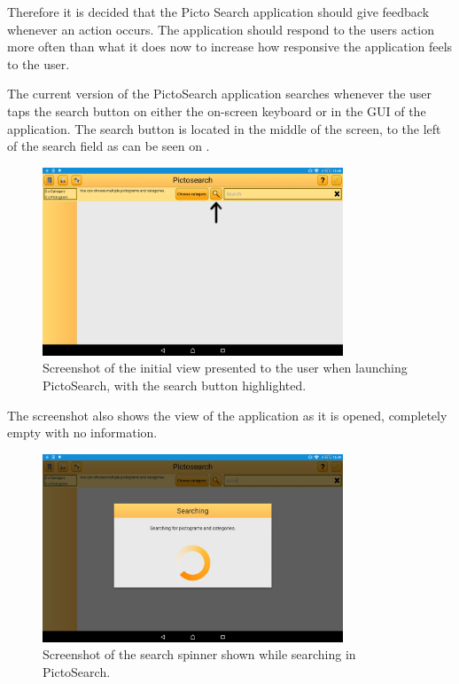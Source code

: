 Therefore it is decided that the Picto Search application should give feedback whenever an action occurs.
The application should respond to the users action more often than what it does now to increase how responsive the application feels to the user.

The current version of the PictoSearch application searches whenever the user taps the search button on either the on-screen keyboard or in the GUI of the application.
The search button is located in the middle of the screen, to the left of the search field as can be seen on .

\begin{figure}[h]
    \centering
    \includegraphics[width=0.8\textwidth]{figures/img/screenshots/old_startup.png}
    \caption{Screenshot of the initial view presented to the user when launching PictoSearch, with the search button highlighted.}\label{fig:screenshot_startup}
\end{figure}
\noindent
The screenshot also shows the view of the application as it is opened, completely empty with no information.

\begin{figure}[h]
    \centering
    \includegraphics[width=0.8\textwidth]{figures/img/screenshots/old_dialog.png}
    \caption{Screenshot of the search spinner shown while searching in PictoSearch.}\label{fig:screenshot_searchspinner}
\end{figure}

